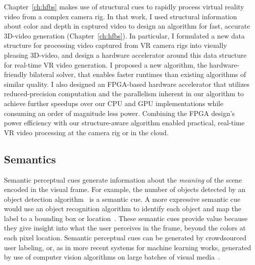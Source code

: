 Chapter~\ref{ch:hfbs} makes use of structural cues to rapidly process virtual reality video from a complex camera rig.
In that work, I used structural information about color and depth in captured video to design an algorithm for fast, accurate 3D-\threesixty video generation (Chapter~\ref{ch:hfbs}).
In particular, I formulated a new data structure for processing video captured from VR camera rigs into visually pleasing 3D-\threesixty video, and design a hardware accelerator around this data structure for real-time VR video generation.
I proposed a new algorithm, the hardware-friendly bilateral solver, that enables faster runtimes than existing algorithms of similar quality.
I also designed an FPGA-based hardware accelerator that utilizes reduced-precision computation and the parallelism inherent in our algorithm to achieve further speedups over our CPU and GPU implementations while consuming an order of magnitude less power.
Combining the FPGA design's power efficiency with our structure-aware algorithm enabled practical, real-time VR video processing at the camera rig or in the cloud.

\subsection{Semantics}
Semantic perceptual cues generate information about the \emph{meaning} of the scene encoded in the visual frame.
For example, the number of objects detected by an object detection algorithm~\cite{vj_journal} is a semantic cue.
A more expressive semantic cue would use an object recognition algorithm to identify each object and map the label to a bounding box or location~\cite{redmon2017yolo}.
These semantic cues provide value because they give insight into what the user perceives in the frame, beyond the colors at each pixel location.
Semantic perceptual cues can be generated by crowdsourced user labeling, or, as in more recent systems for machine learning works, generated by use of computer vision algorithms on large batches of visual media~\cite{poms2018scanner}.

